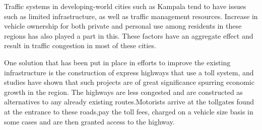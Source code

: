     Traffic systems in developing-world cities such as Kampala tend to have issues such as limited infrastructure, as well as traffic management resources. Increase in vehicle ownership for both private and personal use among residents in these regions has also played a part in this\cite{gomez-gelvez_modeling_2013}. These factors have an aggregate effect and result in traffic congestion in most of these cities\cite{bashingi_state_2020}.

    One solution that has been put in place in efforts to improve the existing infrastructure is the construction of express highways that use a toll system, and studies have shown that such projects are of great significance spurring economic growth in the region\cite{muvawala_socio-economic_2021}. The highways are less congested and are constructed as alternatives to any already existing routes.Motorists arrive at the tollgates found at the entrance to these roads,pay the toll fees, charged on a vehicle size basis in some cases and are then granted access to the highway.

